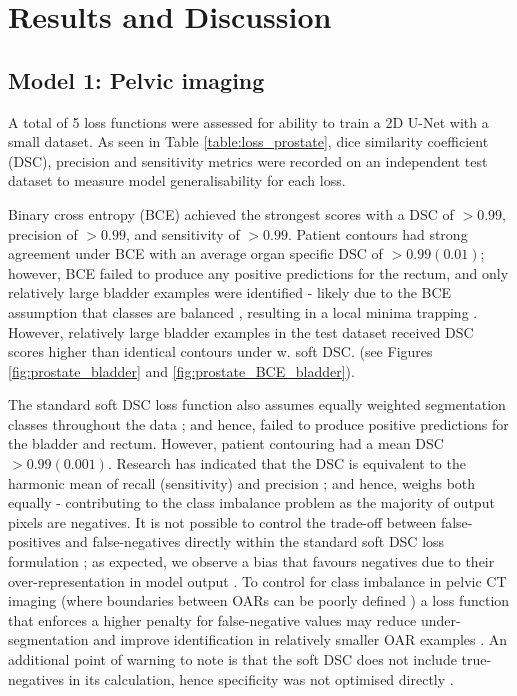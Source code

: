 \chapter{Results and Discussion}
\label{ch:results}

\section{Model 1: Pelvic imaging}
A total of 5 loss functions were assessed for ability to train a 2D U-Net with a small dataset. As seen in Table \ref{table:loss_prostate}, dice similarity coefficient (DSC), precision and sensitivity metrics were recorded on an independent test dataset to measure model generalisability for each loss. 

Binary cross entropy (BCE) achieved the strongest scores with a DSC of $>0.99$, precision of $>0.99$, and sensitivity of $>0.99$. Patient contours had strong agreement under BCE with an average organ specific DSC of $> 0.99(0.01)$; however, BCE failed to produce any positive predictions for the rectum, and only relatively large bladder examples were identified - likely due to the BCE assumption that classes are balanced \cite{Ronneberger_2015}, resulting in a local minima trapping \cite{Khan2019}. However, relatively large bladder examples in the test dataset received DSC scores higher than identical contours under w. soft DSC. (see Figures \ref{fig:prostate_bladder} and \ref{fig:prostate_BCE_bladder}).  

The standard soft DSC loss function also assumes equally weighted segmentation classes throughout the data \cite{Sudre_2017}; and hence, failed to produce positive predictions for the bladder and rectum. However, patient contouring had a mean DSC $> 0.99(0.001)$. Research has indicated that the DSC is equivalent to the harmonic mean of recall (sensitivity) and precision \cite{Bebis2019}; and hence, weighs both equally \cite{Bebis2019} - contributing to the class imbalance problem as the majority of output pixels are negatives. It is not possible to control the trade-off between false-positives and false-negatives directly within the standard soft DSC loss formulation \cite{taghanaki2018};
as expected, we observe a bias that favours negatives due to their over-representation in model output \cite{taghanaki2018}. To control for class imbalance in pelvic CT imaging (where boundaries between OARs can be poorly defined \cite{Liu_2020}) a loss function that enforces a higher penalty for false-negative values may reduce under-segmentation and improve identification in relatively smaller OAR examples \cite{taghanaki2018}. An additional point of warning to note is that the soft DSC does not include true-negatives in its calculation, hence specificity was not optimised directly \cite{taghanaki2018}.

